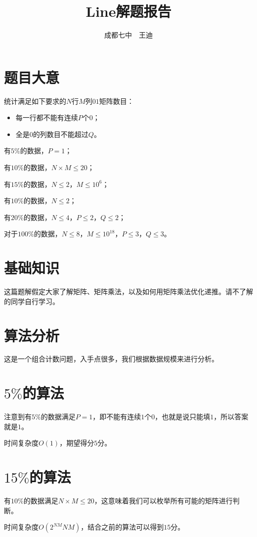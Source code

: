 \documentclass[a4paper]{article}
\begin{document}
\title{Line解题报告}
\author{成都七中\ \  王迪}
\maketitle
\tableofcontents

\newpage

\section{题目大意}
统计满足如下要求的$N$行$M$列$01$矩阵数目：
\begin{itemize}
\item 每一行都不能有连续$P$个$0$；
\item 全是$0$的列数目不能超过$Q$。
\end{itemize}
\par
有$5\%$的数据，$P=1$； \par
有$10\%$的数据，$N \times M \le 20$； \par
有$15\%$的数据，$N \le 2$，$M \le 10^6$； \par
有$10\%$的数据，$N \le 2$； \par
有$20\%$的数据，$N \le 4$，$P \le 2$，$Q \le 2$； \par
对于$100\%$的数据，$N \le 8$，$M \le 10^{18}$，$P \le 3$，$Q \le 3$。 \par

\section{基础知识}
这篇题解假定大家了解矩阵、矩阵乘法，以及如何用矩阵乘法优化递推。请不了解的同学自行学习。

\section{算法分析}
这是一个组合计数问题，入手点很多，我们根据数据规模来进行分析。

\section{$5\%$的算法}
注意到有$5\%$的数据满足$P=1$，即不能有连续$1$个$0$，也就是说只能填$1$，所以答案就是$1$。 \par
时间复杂度$O(1)$，期望得分$5$分。

\section{$15\%$的算法}
有$10\%$的数据满足$N \times M \le 20$，这意味着我们可以枚举所有可能的矩阵进行判断。 \par
时间复杂度$O(2^{NM}NM)$，结合之前的算法可以得到$15$分。
\end{document}
